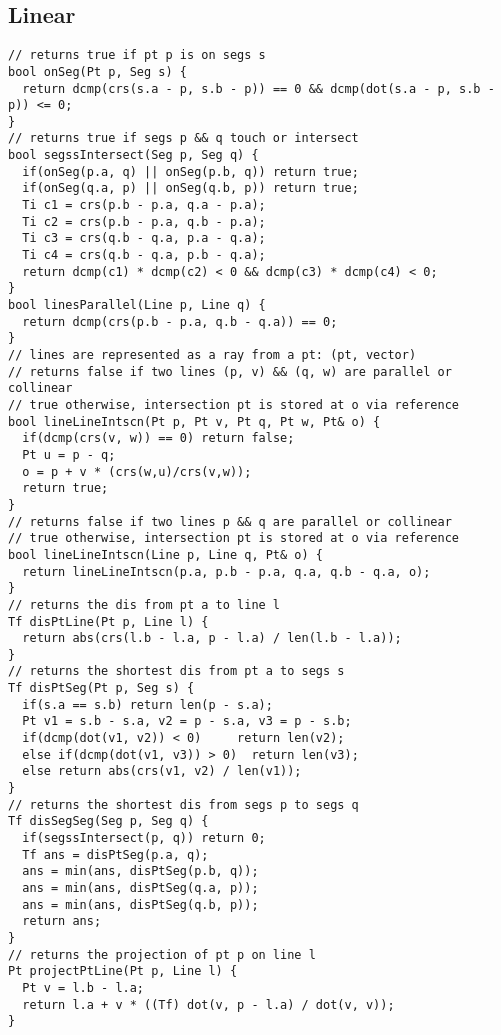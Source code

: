 \documentclass[FSZ,a4paper,onesided]{article}
\begin{document}
\begin{multicols*}{\COLS}
\subsection{Linear}
\begin{lstlisting}
// returns true if pt p is on segs s
bool onSeg(Pt p, Seg s) {
  return dcmp(crs(s.a - p, s.b - p)) == 0 && dcmp(dot(s.a - p, s.b - p)) <= 0;
}
// returns true if segs p && q touch or intersect
bool segssIntersect(Seg p, Seg q) {
  if(onSeg(p.a, q) || onSeg(p.b, q)) return true;
  if(onSeg(q.a, p) || onSeg(q.b, p)) return true;
  Ti c1 = crs(p.b - p.a, q.a - p.a);
  Ti c2 = crs(p.b - p.a, q.b - p.a);
  Ti c3 = crs(q.b - q.a, p.a - q.a);
  Ti c4 = crs(q.b - q.a, p.b - q.a);
  return dcmp(c1) * dcmp(c2) < 0 && dcmp(c3) * dcmp(c4) < 0;
}
bool linesParallel(Line p, Line q) {
  return dcmp(crs(p.b - p.a, q.b - q.a)) == 0;
}
// lines are represented as a ray from a pt: (pt, vector)
// returns false if two lines (p, v) && (q, w) are parallel or collinear
// true otherwise, intersection pt is stored at o via reference
bool lineLineIntscn(Pt p, Pt v, Pt q, Pt w, Pt& o) {
  if(dcmp(crs(v, w)) == 0) return false;
  Pt u = p - q;
  o = p + v * (crs(w,u)/crs(v,w));
  return true;
}
// returns false if two lines p && q are parallel or collinear
// true otherwise, intersection pt is stored at o via reference
bool lineLineIntscn(Line p, Line q, Pt& o) {
  return lineLineIntscn(p.a, p.b - p.a, q.a, q.b - q.a, o);
}
// returns the dis from pt a to line l
Tf disPtLine(Pt p, Line l) {
  return abs(crs(l.b - l.a, p - l.a) / len(l.b - l.a));
}
// returns the shortest dis from pt a to segs s
Tf disPtSeg(Pt p, Seg s) {
  if(s.a == s.b) return len(p - s.a);
  Pt v1 = s.b - s.a, v2 = p - s.a, v3 = p - s.b;
  if(dcmp(dot(v1, v2)) < 0)     return len(v2);
  else if(dcmp(dot(v1, v3)) > 0)  return len(v3);
  else return abs(crs(v1, v2) / len(v1));
}
// returns the shortest dis from segs p to segs q
Tf disSegSeg(Seg p, Seg q) {
  if(segssIntersect(p, q)) return 0;
  Tf ans = disPtSeg(p.a, q);
  ans = min(ans, disPtSeg(p.b, q));
  ans = min(ans, disPtSeg(q.a, p));
  ans = min(ans, disPtSeg(q.b, p));
  return ans;
}
// returns the projection of pt p on line l
Pt projectPtLine(Pt p, Line l) {
  Pt v = l.b - l.a;
  return l.a + v * ((Tf) dot(v, p - l.a) / dot(v, v));
}
\end{lstlisting}

\end{multicols*}
\end{document}

